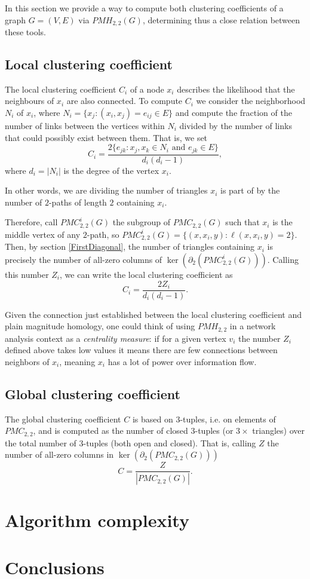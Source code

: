 \documentclass[runningheads]{llncs}
\begin{document}
In this section we provide a way to compute both clustering coefficients of a graph $G=(V,E)$ via $PMH_{2,2}(G)$, determining thus a close relation between these tools.


\subsection{Local clustering coefficient}

The local clustering coefficient $C_i$ of a node $x_i$ describes the likelihood that the neighbours of $x_i$ are also connected.
To compute $C_i$ we consider the neighborhood $N_i$ of $x_i$, where $N_i=\{x_j:(x_i,x_j)=e_{ij}\in E\}$ and compute the fraction of the number of links between the vertices within $N_i$ divided by the number of links that could possibly exist between them.
That is, we set
\[
C_i = \frac{2\{e_{jk}:x_j,x_k \in N_i \text{ and } e_{jk}\in E\}}{d_i(d_i -1)},
\]
where $d_i=|N_i|$ is the degree of the vertex $x_i$.

In other words, we are dividing the number of triangles $x_i$ is part of by the number of $2$-paths of length $2$ containing $x_i$.

Therefore, call $PMC_{2,2}^i(G)$ the subgroup of $PMC_{2,2}(G)$ such that $x_i$ is the middle vertex of any $2$-path, so $PMC_{2,2}^i(G)=\{(x,x_i,y): \ell(x,x_i,y)=2\}$.
Then, by section \ref{FirstDiagonal}, the number of triangles containing $x_i$ is precisely the number of all-zero columns of $\ker(\partial_2(PMC_{2,2}^i(G)))$.
Calling this number $Z_i$, we can write the local clustering coefficient as
\[
C_i = \frac{2 Z_i}{d_i(d_i -1)}.
\]

\begin{remark}
Given the connection just established between the local clustering coefficient and plain magnitude homology, one could think of using $PMH_{2,2}$ in a network analysis context as a \emph{centrality measure}: if for a given vertex $v_i$ the number $Z_i$ defined above takes low values it means there are few connections between neighbors of $x_i$, meaning $x_i$ has a lot of power over information flow. 
\end{remark}


\subsection{Global clustering coefficient}

The global clustering coefficient $C$ is based on $3$-tuples, i.e. on elements of $PMC_{2,2}$, and is computed as the number of closed $3$-tuples (or $3  \times$ triangles) over the total number of $3$-tuples (both open and closed).
That is, calling $Z$ the number of all-zero columns in $\ker(\partial_2(PMC_{2,2}(G)))$
\[
C = \frac{Z}{|PMC_{2,2}(G)|}.
\]

\section{Algorithm complexity}

\section{Conclusions}



\end{document}
